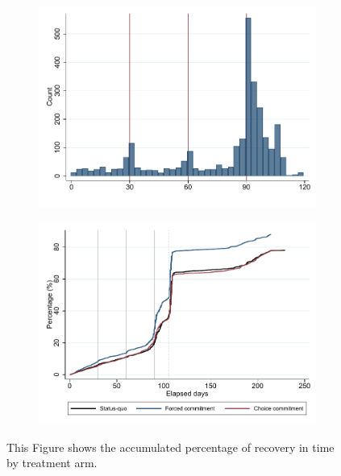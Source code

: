 \documentclass[oneside,11pt]{article}
\begin{document}
\begin{figure}[H]
\begin{center}
\begin{subfigure}{0.31\textwidth}
        \centering
        \includegraphics[width=\textwidth]{Figuras/hist_payments_cc.pdf}
    \end{subfigure}    
    \end{center}
     \scriptsize
\end{figure}


\begin{figure}[H]
        \caption{Survival graph}
    \label{survival_graph}
    \begin{center}
   \begin{subfigure}{0.49\textwidth}
        \centering
        \includegraphics[width=\textwidth]{Figuras/survival_graph_ended.pdf}
    \end{subfigure} 
    \end{center}
     \scriptsize  This Figure shows the accumulated percentage of recovery in time by treatment arm. 
\end{figure}
\end{document}
